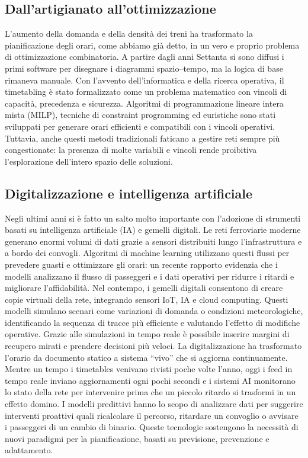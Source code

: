 \documentclass[a4paper,12pt]{report}
\begin{document}
\subsection{Dall’artigianato all’ottimizzazione}
L’aumento della domanda e della densità dei treni ha trasformato la pianificazione degli orari, come abbiamo già detto, in un vero e proprio problema di ottimizzazione combinatoria. A partire dagli anni Settanta si sono diffusi i primi software per disegnare i diagrammi spazio–tempo, ma la logica di base rimaneva manuale. Con l’avvento dell’informatica e della ricerca operativa, il timetabling è stato formalizzato come un problema matematico con vincoli di capacità, precedenza e sicurezza. Algoritmi di programmazione lineare intera mista (MILP), tecniche di constraint programming ed euristiche sono stati sviluppati per generare orari efficienti e compatibili con i vincoli operativi.
Tuttavia, anche questi metodi tradizionali faticano a gestire reti sempre più congestionate: la presenza di molte variabili e vincoli rende proibitiva l’esplorazione dell’intero spazio delle soluzioni.
\subsection{Digitalizzazione e intelligenza artificiale}
Negli ultimi anni si è fatto un salto molto importante con l’adozione di strumenti basati su intelligenza artificiale (IA) e gemelli digitali. Le reti ferroviarie moderne generano enormi volumi di dati grazie a sensori distribuiti lungo l’infrastruttura e a bordo dei convogli. Algoritmi di machine learning utilizzano questi flussi per prevedere guasti e ottimizzare gli orari: un recente rapporto evidenzia che i modelli analizzano il flusso di passeggeri e i dati operativi per ridurre i ritardi e migliorare l’affidabilità.
Nel contempo, i gemelli digitali consentono di creare copie virtuali della rete, integrando sensori IoT, IA e cloud computing. Questi modelli simulano scenari come variazioni di domanda o condizioni meteorologiche, identificando la sequenza di tracce più efficiente e valutando l’effetto di modifiche operative.
Grazie alle simulazioni in tempo reale è possibile inserire margini di recupero mirati e prendere decisioni più veloci.
La digitalizzazione ha trasformato l’orario da documento statico a sistema “vivo” che si aggiorna continuamente. Mentre un tempo i timetables venivano rivisti poche volte l’anno, oggi i feed in tempo reale inviano aggiornamenti ogni pochi secondi e i sistemi AI monitorano lo stato della rete per intervenire prima che un piccolo ritardo si trasformi in un effetto domino.
I modelli predittivi hanno lo scopo di analizzare dati per suggerire interventi proattivi quali ricalcolare il percorso, ritardare un convoglio o avvisare i passeggeri di un cambio di binario.
Queste tecnologie sostengono la necessità di nuovi paradigmi per la pianificazione, basati su previsione, prevenzione e adattamento.
\end{document}
